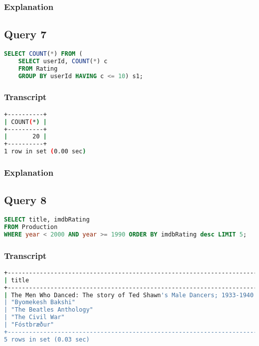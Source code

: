 \subsubsection{Explanation}


\subsection{Query 7}
\begin{lstlisting}[language=sql]
SELECT COUNT(*) FROM (
	SELECT userId, COUNT(*) c
	FROM Rating
	GROUP BY userId HAVING c <= 10) s1;
\end{lstlisting}

\subsubsection{Transcript}
\begin{lstlisting}[language=bash]
+----------+
| COUNT(*) |
+----------+
|       20 |
+----------+
1 row in set (0.00 sec)
\end{lstlisting}

\subsubsection{Explanation}


\subsection{Query 8}
\begin{lstlisting}[language=sql]
SELECT title, imdbRating
FROM Production
WHERE year < 2000 AND year >= 1990 ORDER BY imdbRating desc LIMIT 5;
\end{lstlisting}

\subsubsection{Transcript}
\begin{lstlisting}[language=bash]
+----------------------------------------------------------------------+-------------------+
| title                                                                | imdbRating        |
+----------------------------------------------------------------------+-------------------+
| The Men Who Danced: The story of Ted Shawn's Male Dancers; 1933-1940 | 9.399999618530273 |
| "Byomekesh Bakshi"                                                   | 9.399999618530273 |
| "The Beatles Anthology"                                              | 9.399999618530273 |
| "The Civil War"                                                      | 9.399999618530273 |
| "Fóstbræður"                                                         | 9.399999618530273 |
+----------------------------------------------------------------------+-------------------+
5 rows in set (0.03 sec)
\end{lstlisting}

